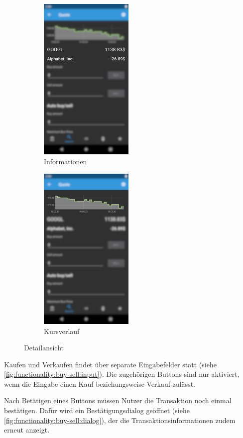 \documentclass[a4paper]{article}
\begin{document}
\begin{figure}[H]
	\begin{subfigure}{.5\textwidth}
		\centering
		\includegraphics[height=8cm,keepaspectratio]{./images/quote/information.png}
		\caption{Informationen}
		\label{fig:functionality:quote:information}
	\end{subfigure}
	\begin{subfigure}{.5\textwidth}
		\centering
		\includegraphics[height=8cm,keepaspectratio]{./images/quote/history.png}
		\caption{Kursverlauf}
		\label{fig:functionality:quote:history}
	\end{subfigure}
	\caption{Detailansicht}
	\label{fig:functionality:quote}
\end{figure}

Kaufen und Verkaufen findet über separate Eingabefelder statt (siehe \autoref{fig:functionality:buy-sell:input}).
Die zugehörigen Buttons sind nur aktiviert, wenn die Eingabe einen Kauf beziehungsweise Verkauf zulässt.

Nach Betätigen eines Buttons müssen Nutzer die Transaktion noch einmal bestätigen.
Dafür wird ein Bestätigungsdialog geöffnet (siehe \autoref{fig:functionality:buy-sell:dialog}), der die Transaktionsinformationen zudem erneut anzeigt.
\end{document}
